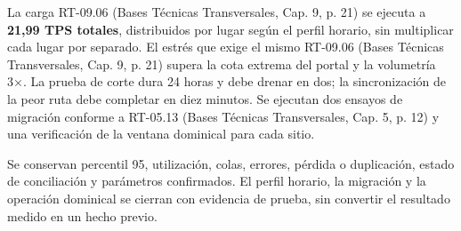 La carga RT-09.06 (Bases Técnicas Transversales, Cap. 9, p. 21) se ejecuta a \textbf{21,99 TPS totales}, distribuidos por lugar según el perfil horario, sin multiplicar cada lugar por separado. El estrés que exige el mismo RT-09.06 (Bases Técnicas Transversales, Cap. 9, p. 21) supera la cota extrema del portal y la volumetría 3×. La prueba de corte dura 24 horas y debe drenar en dos; la sincronización de la peor ruta debe completar en diez minutos. Se ejecutan dos ensayos de migración conforme a RT-05.13 (Bases Técnicas Transversales, Cap. 5, p. 12) y una verificación de la ventana dominical para cada sitio.

Se conservan percentil 95, utilización, colas, errores, pérdida o duplicación, estado de conciliación y parámetros confirmados. El perfil horario, la migración y la operación dominical se cierran con evidencia de prueba, sin convertir el resultado medido en un hecho previo.

\endgroup
